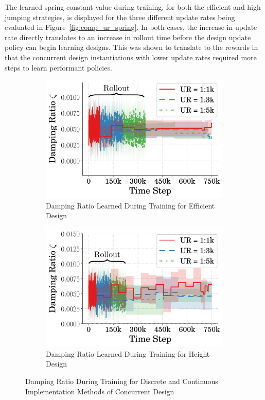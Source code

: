 % 
The learned spring constant value during training, for both the efficient and high jumping strategies, is displayed for the three different update rates being evaluated in Figure~\ref{fig:comp_ur_spring}. In both cases, the increase in update rate directly translates to an increase in rollout time before the design update policy can begin learning designs. This was shown to translate to the rewards in that the concurrent design instantiations with lower update rates required more steps to learn performant policies. 

%  
\begin{figure}[tb!]
  \centering
  \begin{subfigure}{.49\textwidth}
          \centering
          \includegraphics[width=\textwidth]{figures/Ch5/comp_update_rate/avg_eff_zeta_.png}  
          \caption{Damping Ratio Learned During Training for Efficient Design}
          \label{fig:comp_ur_zeta_eff}
  \end{subfigure}%
  \hfill
  \begin{subfigure}{.49\textwidth}
          \centering
          \includegraphics[width=\textwidth]{figures/Ch5/comp_update_rate/avg_hei_zeta_.png}  
          \caption{Damping Ratio Learned During Training for Height Design}
          \label{fig:comp_ur_zeta_high}
  \end{subfigure}
   \caption{Damping Ratio During Training for Discrete and Continuous Implementation Methods of Concurrent Design}
   \label{fig:comp_ur_zeta}
\end{figure}
% 


